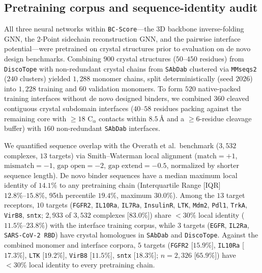 \documentclass[10pt,twocolumn]{article}
\begin{document}
\subsection{Pretraining corpus and sequence-identity audit}
\label{sec:pretraining}
All three neural networks within \texttt{BC-Score}---the 3D backbone inverse-folding GNN, the 2-Point sidechain reconstruction GNN, and the pairwise interface potential---were pretrained on crystal structures prior to evaluation on de novo design benchmarks. Combining $900$ crystal structures ($50\text{--}450$ residues) from \texttt{DiscoTope} \cite{kringelum2012discotope} with non-redundant crystal chains from \texttt{SAbDab} \cite{dunbar2014sabdab} clustered via \texttt{MMseqs2} \cite{steinegger2017mmseqs2} ($240$ clusters) yielded $1,288$ monomer chains, split deterministically (seed $2026$) into $1,228$ training and $60$ validation monomers. To form $520$ native-packed training interfaces without de novo designed binders, we combined $360$ cleaved contiguous crystal subdomain interfaces ($40\text{--}58$ residues packing against the remaining core with $\ge 18$ $\text{C}_\alpha$ contacts within $8.5\,\text{\AA}$ and a $\ge 6$-residue cleavage buffer) with $160$ non-redundant \texttt{SAbDab} interfaces.

We quantified sequence overlap with the Overath et al.\ benchmark ($3,532$ complexes, $13$ targets) via Smith--Waterman local alignment ($\text{match} = +1$, $\text{mismatch} = -1$, $\text{gap open} = -2$, $\text{gap extend} = -0.5$, normalized by shorter sequence length). De novo binder sequences have a median maximum local identity of $14.1\%$ to any pretraining chain (Interquartile Range [IQR] $12.8\%\text{--}15.8\%$, 95th percentile $19.4\%$, maximum $30.0\%$). Among the $13$ target receptors, $10$ targets (\texttt{FGFR2}, \texttt{IL10Ra}, \texttt{IL7Ra}, \texttt{InsulinR}, \texttt{LTK}, \texttt{Mdm2}, \texttt{Pdl1}, \texttt{TrkA}, \texttt{VirB8}, \texttt{sntx}; $2,933$ of $3,532$ complexes [$83.0\%$]) share $<30\%$ local identity ($11.5\%\text{--}23.8\%$) with the interface training corpus, while $3$ targets (\texttt{EGFR}, \texttt{IL2Ra}, \texttt{SARS-CoV-2 RBD}) have crystal homologues in \texttt{SAbDab} and \texttt{DiscoTope}. Against the combined monomer and interface corpora, $5$ targets (\texttt{FGFR2} [$15.9\%$], \texttt{IL10Ra} [$17.3\%$], \texttt{LTK} [$19.2\%$], \texttt{VirB8} [$11.5\%$], \texttt{sntx} [$18.3\%$]; $n=2,326$ [$65.9\%$]) have $<30\%$ local identity to every pretraining chain.
\end{document}
